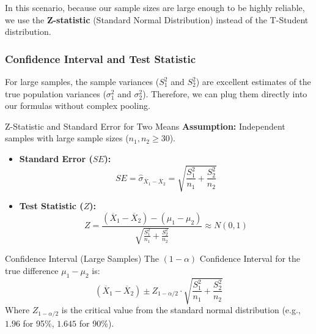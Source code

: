 In this scenario, because our sample sizes are large enough to be highly reliable, we use the \textbf{Z-statistic} (Standard Normal Distribution) instead of the T-Student distribution.

\subsubsection{Confidence Interval and Test Statistic}

For large samples, the sample variances ($S_1^2$ and $S_2^2$) are excellent estimates of the true population variances ($\sigma_1^2$ and $\sigma_2^2$). Therefore, we can plug them directly into our formulas without complex pooling.

\begin{defbox}{Z-Statistic and Standard Error for Two Means}
\textbf{Assumption:} Independent samples with large sample sizes ($n_1, n_2 \ge 30$).

\begin{itemize}
    \item \textbf{Standard Error ($SE$):}
    \begin{equation}
        SE = \hat{\sigma}_{\overline{X}_1 - \overline{X}_2} = \sqrt{\frac{S_1^2}{n_1} + \frac{S_2^2}{n_2}}
    \end{equation} 
    \item \textbf{Test Statistic ($Z$):}
    \begin{equation}
        Z = \frac{(\overline{X}_1 - \overline{X}_2) - (\mu_1 - \mu_2)}{\sqrt{\frac{S_1^2}{n_1} + \frac{S_2^2}{n_2}}} \approx N(0,1) 
    \end{equation}
\end{itemize}
\end{defbox}

\begin{defbox}{Confidence Interval (Large Samples)}
The $(1-\alpha)$ Confidence Interval for the true difference $\mu_1 - \mu_2$ is:
\begin{equation}
    (\overline{X}_1 - \overline{X}_2) \pm Z_{1-\alpha/2} \cdot \sqrt{\frac{S_1^2}{n_1} + \frac{S_2^2}{n_2}} 
\end{equation} 
Where $Z_{1-\alpha/2}$ is the critical value from the standard normal distribution (e.g., $1.96$ for 95\%, $1.645$ for 90\%).
\end{defbox}

